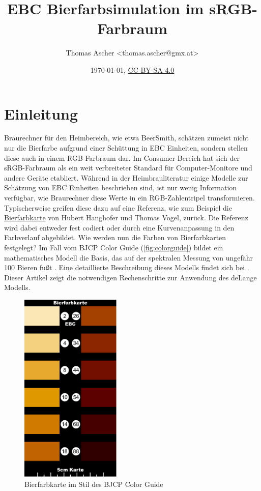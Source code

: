 \documentclass[10pt,a4paper,DIV=12,parskip=half]{scrarticle}
\title{EBC Bierfarbsimulation im sRGB-Farbraum}
\author{Thomas Ascher <thomas.ascher@gmx.at>}
\date{\today, \href{http://creativecommons.org/licenses/by-sa/4.0/}{CC BY-SA 4.0}}
\begin{document}
\maketitle

\section*{Einleitung}

Braurechner für den Heimbereich, wie etwa BeerSmith, schätzen zumeist nicht nur die Bierfarbe aufgrund einer Schüttung in EBC Einheiten, sondern stellen diese auch in einem RGB-Farbraum dar. Im Consumer-Bereich hat sich der sRGB-Farbraum als ein weit verbreiteter Standard für Computer-Monitore und andere Geräte etabliert. Während in der Heimbrauliteratur einige Modelle zur Schätzung von EBC Einheiten beschrieben sind, ist nur wenig Information verfügbar, wie Braurechner diese Werte in ein RGB-Zahlentripel transformieren. Typischerweise greifen diese dazu auf eine Referenz, wie zum Beispiel die \href{https://www.bierfarbkarte.de}{Bierfarbkarte} von Hubert Hanghofer und Thomas Vogel, zurück. Die Referenz wird dabei entweder fest codiert oder durch eine Kurvenanpassung in den Farbverlauf abgebildet. Wie werden nun die Farben von Bierfarbkarten festgelegt? Im Fall vom BJCP Color Guide (\autoref{fig:colorguide}) bildet ein mathematisches Modell die Basis, das auf der spektralen Messung von ungefähr 100 Bieren fußt \autocite{BJCP}. Eine detaillierte Beschreibung dieses Modells findet sich bei \textcite{deLange2016}. Dieser Artikel zeigt die notwendigen Rechenschritte zur Anwendung des deLange Modells.

\begin{figure}[H]
	\centering
	\includegraphics[width=4.8cm]{color_guide.pdf}
	\caption{Bierfarbkarte im Stil des BJCP Color Guide}
	\label{fig:colorguide}
\end{figure}
\end{document}
